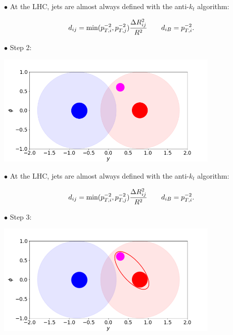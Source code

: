 \documentclass[9pt,a4paper,unknownkeysallowed,xcolor=dvipsnames,aspectratio=43]{beamer}
\begin{document}
%
%
%
\begin{frame}

{\color{darkred}\Large$\bullet$} {\color{darkred} At the LHC, jets are almost always defined with the anti-$k_t$ algorithm:}

  \begin{equation}
    d_{ij} = \text{min}(p_{T,i}^{-2},p_{T,j}^{-2})\frac{\Delta R_{ij}^2}{R^2}\qquad d_{iB} = p_{T,i}^{-2}.
  \notag\end{equation}
 \vspace{2mm}
  
{\color{darkred}\Large$\bullet$} Step 2:
\vspace{2mm}
\begin{center}
\includegraphics[width=0.8\textwidth]{antikt2.png}
\end{center}
\end{frame}
%
%
\begin{frame}

{\color{darkred}\Large$\bullet$} {\color{darkred} At the LHC, jets are almost always defined with the anti-$k_t$ algorithm:}

  \begin{equation}
    d_{ij} = \text{min}(p_{T,i}^{-2},p_{T,j}^{-2})\frac{\Delta R_{ij}^2}{R^2}\qquad d_{iB} = p_{T,i}^{-2}.
  \notag\end{equation}
 \vspace{2mm}
  
{\color{darkred}\Large$\bullet$} Step 3:
\vspace{2mm}
\begin{center}
\includegraphics[width=0.8\textwidth]{antikt23.png}
\end{center}
\end{frame}
\end{document}
